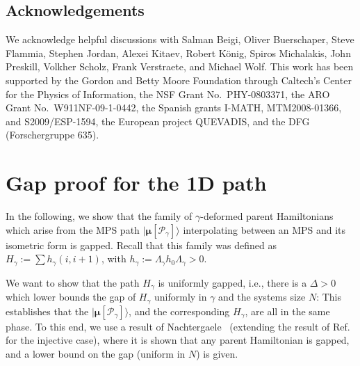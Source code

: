 \documentclass[twocolumn,superscriptaddress,prb,linenumbers]{revtex4-1}
\newcommand{\MPS}[1]{| {\bm\mu}[#1]\rangle}
\newcommand{\mc}[1]{\mathcal{#1}}
\begin{document}
\subsection*{Acknowledgements}

We acknowledge helpful discussions with
Salman Beigi,
Oliver Buerschaper,
Steve Flammia,
Stephen Jordan,
Alexei Kitaev,
Robert K\"onig,
Spiros Michalakis,
John Preskill,
Volkher Scholz,
Frank Verstraete,
and
Michael Wolf.
%
This work has been supported by the Gordon and Betty Moore Foundation
through Caltech's Center for the Physics of Information, the NSF Grant
No.~\mbox{PHY-0803371}, the ARO Grant No.~W911NF-09-1-0442,
the Spanish grants I-MATH, MTM2008-01366, and
\mbox{S2009/ESP-1594},
the European project QUEVADIS, and the DFG (Forschergruppe 635).






\appendix

\section{Gap proof for the 1D path}

In the following, we show that the family of $\gamma$-deformed parent
Hamiltonians which arise from the MPS path $\MPS{\mc P_\gamma}$ interpolating
between an MPS and its isometric form is gapped. Recall that this family
was defined as $H_\gamma:=\sum h_\gamma(i,i+1)$, with
$h_\gamma:=\Lambda_\gamma h_0\Lambda_\gamma>0$.

We want to show that the path $H_\gamma$ is uniformly gapped, i.e., there
is a $\Delta>0$ which lower bounds the gap of $H_\gamma$ uniformly in
$\gamma$ and the systems size $N$: This establishes that the
$\MPS{\mc P_\gamma}$, and the corresponding $H_\gamma$,  are all in the same
phase. To this end, we use a result of
Nachtergaele~\cite{nachtergaele:degen-mps} (extending the result
of Ref.~ for the injective case), where it is shown that any
parent Hamiltonian is gapped, and a lower bound on the gap (uniform in
$N$) is given.
\end{document}
